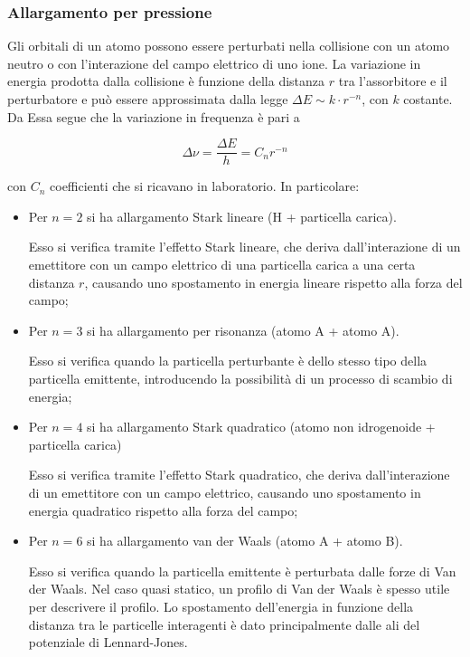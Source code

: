 \subsubsection{Allargamento per pressione}

Gli orbitali di un atomo possono essere perturbati nella collisione con un atomo neutro o con l'interazione del campo elettrico di uno ione. La variazione in energia prodotta dalla collisione è funzione della distanza $r$ tra l'assorbitore e il perturbatore e può essere approssimata dalla legge $\Delta E \sim k \cdot r^{-n}$, con $k$ costante. Da Essa segue che la variazione in frequenza è pari a

\begin{equation*}
  \Delta \nu=\frac{\Delta E}{h}=C_n r^{-n}
\end{equation*}

con $C_n$ coefficienti che si ricavano in laboratorio. In particolare:

\begin{itemize}
  \item Per $n=2$ si ha allargamento Stark lineare (H + particella carica).
  
  Esso si verifica tramite l'effetto Stark lineare, che deriva dall'interazione di un emettitore con un campo elettrico di una particella carica a una certa distanza $r$, causando uno spostamento in energia lineare rispetto alla forza del campo;
  \item Per $n=3$ si ha allargamento per risonanza (atomo A + atomo A).
  
  Esso si verifica quando la particella perturbante è dello stesso tipo della particella emittente, introducendo la possibilità di un processo di scambio di energia;
  \item Per $n=4$ si ha allargamento Stark quadratico (atomo non idrogenoide + particella carica)
  
  Esso si verifica tramite l'effetto Stark quadratico, che deriva dall'interazione di un emettitore con un campo elettrico, causando uno spostamento in energia quadratico rispetto alla forza del campo;
  \item Per $n=6$ si ha allargamento van der Waals (atomo A + atomo B).
  
  Esso si verifica quando la particella emittente è perturbata dalle forze di Van der Waals. Nel caso quasi statico, un profilo di Van der Waals è spesso utile per descrivere il profilo. Lo spostamento dell'energia in funzione della distanza tra le particelle interagenti è dato principalmente dalle ali del potenziale di Lennard-Jones.
\end{itemize}

